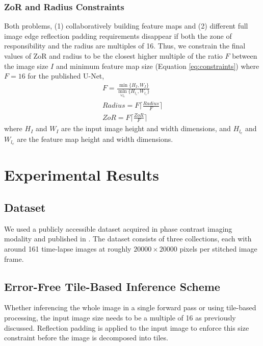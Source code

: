 \documentclass[letterpaper]{article} %
\begin{document}
\subsubsection{ZoR and Radius Constraints}

Both problems, (1) collaboratively building feature maps and (2) different full image edge reflection padding requirements disappear if both the zone of responsibility and the radius are multiples of 16. Thus, we constrain the final values of ZoR and radius to be the closest higher multiple of the ratio $F$ between the image size $I$ and minimum feature map size (Equation \ref{eq:constraints}) where $F=16$ for the published U-Net, 
\begin{equation}
\begin{aligned}
F = \frac{ \min\{H_{I}, W_{I} \} }{ \min_{\forall l_{c}} \{ H_{l_{c}}, W_{l_{c}} \} } \\
Radius = F \lceil \frac{Radius}{F} \rceil \\
ZoR = F \lceil \frac{ZoR}{F} \rceil 
\end{aligned}
\label{eq:constraints}
\end{equation}
where $H_{I}$ and $W_{I}$ are the input image height and width dimensions, and $H_{l_{c}}$ and $W_{l_{c}}$ are the feature map height and width dimensions. 

\section{Experimental Results}
\label{experimental-results}

\subsection{Dataset}
\label{dataset}

We used a publicly accessible dataset acquired in phase contrast imaging modality and published in \cite{Bhadriraju2016}. 
The dataset consists of three collections, each with around 161 time-lapse images at roughly $\num{20000} \times \num{20000}$ pixels per stitched image frame. 


\subsection{Error-Free Tile-Based Inference Scheme}

Whether inferencing the whole image in a single forward pass or using tile-based processing, the input image size needs to be a multiple of 16 as previously discussed. Reflection padding is applied to the input image to enforce this size constraint before the image is decomposed into tiles. 
\end{document}
